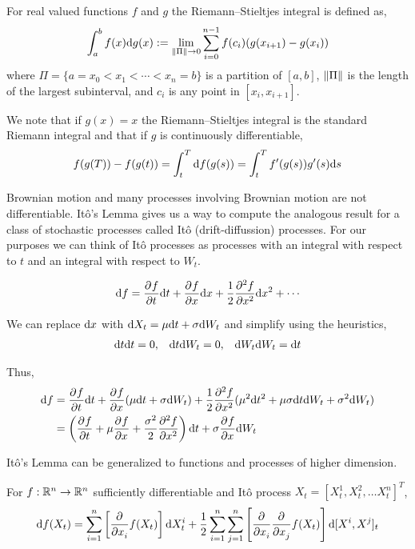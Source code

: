 \documentclass[11pt]{article}
\begin{document}
\begin{definition}
For real valued functions \( f \) and \( g \) the Riemann--Stieltjes integral is defined as,
\begin{align*}
    \int_{a}^{b} f(x) \d g(x) := \lim\limits_{\norm{\Pi}\to 0} \sum_{i=0}^{n-1} f(c_i)(g(x_{i+1}) - g(x_i))
\end{align*}
where \( \Pi = \{a=x_0<x_1 < \cdots < x_n = b\} \) is a partition of \( [a,b] \), \( \norm{\Pi} \) is the length of the largest subinterval, and \( c_i \) is any point in \( [x_i,x_{i+1}] \).
\end{definition}

We note that if \( g(x) = x \) the Riemann--Stieltjes integral is the standard Riemann integral and that if \( g \) is continuously differentiable,
\begin{align*}
    f(g(T)) - f(g(t)) = \int_t^T \d f(g(s)) = \int_t^T f'(g(s))g'(s) \d s
\end{align*}

Brownian motion and many processes involving Brownian motion are not differentiable. It\^o's Lemma gives us a way to compute the analogous result for a class of stochastic processes called It\^o (drift-diffussion) processes. For our purposes we can think of It\^o processes as processes with an integral with respect to \( t \) and an integral with respect to \( W_t \).

\begin{align*}
    \d f = \pp{f}{t}\d t + \pp{f}{x}\d x + \dfrac{1}{2} \pp[2]{f}{x}\d x^2 + \cdots
\end{align*}

We can replace \( \d x \) with \( \d X_t = \mu \d t + \sigma \d W_t \) and simplify using the heuristics,
\begin{align}
    \d t \d t = 0, && \d t \d W_t = 0, && \d W_t \d W_t = \d t \label{heuristics}
\end{align}

Thus,
\begin{align*}
    \d f &= \pp{f}{t}\d t + \pp{f}{x}(\mu \d t + \sigma \d W_t) + \dfrac{1}{2}\pp[2]{f}{x} ( \mu^2 \d t^2 + \mu\sigma \d t\d W_t + \sigma^2 \d W_t ) \\
    &= \left( \pp{f}{t} + \mu \pp{f}{x} + \dfrac{\sigma^2}{2} \pp[2]{f}{x} \right)\d t + \sigma \pp{f}{x}\d W_t
\end{align*}

It\^o's Lemma can be generalized to functions and processes of higher dimension.
\begin{lemma}[It\^o] For \( f:\bR^n\to\bR^n \) sufficiently differentiable and It\^o process \( X_t = [X_t^1, X_t^2, \ldots X_t^n]^T \),
\begin{align}
    \d f(X_t) = \sum_{i=1}^{n} \left[\pp{}{x_i}f(X_t)\right] \d X_t^i + \dfrac{1}{2} \sum_{i=1}^{n} \sum_{j=1}^{n}\left[ \pp{}{x_i} \pp{}{x_j} f(X_t) \right] \d [X^i,X^j]_t \label{itond}
\end{align}
\end{lemma}
\end{document}

